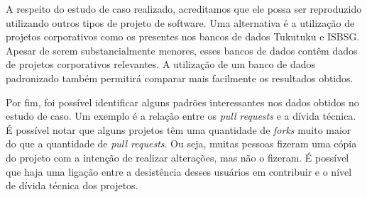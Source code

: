 A respeito do estudo de caso realizado, acreditamos que ele possa ser reproduzido utilizando outros tipos de projeto de software. Uma alternativa é a utilização de projetos corporativos como os presentes nos bancos de dados Tukutuku\cite{mendes2008cross} e ISBSG\cite{fernandez2014potential}. Apesar de serem substancialmente menores, esses bancos de dados contêm dados de projetos  corporativos relevantes. A utilização de um banco de dados padronizado também permitirá comparar mais facilmente os resultados obtidos.

 Por fim, foi possível identificar alguns padrões interessantes nos dados obtidos no estudo de caso. Um exemplo é a relação entre os \textit{pull requests} e a dívida técnica. É possível notar que alguns projetos têm uma quantidade de \textit{forks} muito maior do que a quantidade de \textit{pull requests}. Ou seja, muitas pessoas fizeram uma cópia do projeto com a intenção de realizar alterações, mas não o fizeram. É possível que haja uma ligação entre a desistência desses usuários em contribuir e o nível de dívida técnica dos projetos.





